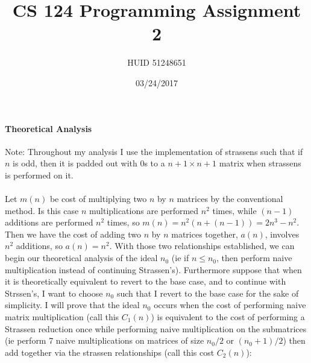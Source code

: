 \documentclass[10pt,letter]{article}
\begin{document}


\title{CS 124 Programming Assignment 2}

\author{HUID 51248651}

\date{03/24/2017}
 
\maketitle 

\paragraph{Theoretical Analysis}
Note: Throughout my analysis I use the implementation of strassens such that if $n$ is odd, then it is padded out with $0$s to a $n+1 \times n+1$ matrix when strassens is performed on it. \\ \\
Let $m(n)$ be cost of multiplying two $n$ by $n$ matrices by the conventional method. Is this case $n$ multiplications are performed $n^2$ times, while $(n-1)$ additions are performed $n^2$ times, so $m(n) = n^2(n+(n-1))= 2n^3-n^2$. Then we have the cost of adding two $n$ by $n$ matrices together, $a(n)$, involves $n^2$ additions, so $a(n) = n^2$. With those two relationships established, we can begin our theoretical analysis of the ideal $n_0$ (ie if $n \le n_0$, then perform naive multiplication instead of continuing Strassen's). Furthermore suppose that when it is theoretically equivalent to revert to the base case, and to continue with Strssen's, I want to choose $n_0$ such that I revert to the base case for the sake of simplicity. I will prove that the ideal $n_0$ occurs when the cost of performing naive matrix multiplication (call this $C_1(n)$) is equivalent to the cost of performing a Strassen reduction once while performing naive multiplication on the submatrices (ie perform 7 naive multiplications on matrices of size $n_0/2$ or $(n_0+1)/2$) then add together via the strassen relationships (call this cost $C_2(n)$): \\
\end{document}
